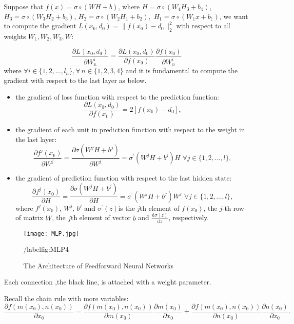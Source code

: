 \documentclass[titlestyle=hang,11pt]{elegantbook}
\begin{document}
Suppose that $f(x)={\sigma}\circ(WH + b)$, where $H=\sigma\circ(W_4H_3 + b_4)$, $H_3=\sigma\circ(W_3H_2 + b_3)$, $H_2=\sigma\circ(W_2H_1 + b_2), $ $H_1=\sigma\circ(W_1x + b_1)$,
we want to compute the gradient $L(x_0,d_0)=\|f(x_0)-d_0\|^{2}_2$ with respect to all weights $W_1,W_2,W_3,W$:

$$\frac{\partial L(x_0,d_0)}{\partial W_n^i}=\frac{\partial L(x_0,d_0)}{\partial f(x_0)}\frac{\partial f(x_0)}{\partial W_n^i}$$
 where $\forall i\in\{1,2,\dots,l_n\}, \forall\,n\in\{1,2,3,4\}$
and it is fundamental to compute the gradient with respect to the last layer as below.
\begin{itemize}
	\item the gradient of loss function with respect to the prediction function:
		$$\frac{\partial L(x_0,d_0)}{\partial f(x_0)}=2[f(x_0)-d_0],$$

	\item the gradient of each unit in prediction function with respect to the weight in the last layer:
		$$
		\frac{\partial f^{j}(x_0)}{\partial W^j}=
		\frac{\partial \sigma(W^jH+b^j)}{\partial W^j}=
		{\sigma}^{\prime}(W^jH+b^j) H \,\,\forall j\in\{1,2,\dots,l\},
		$$

	\item the gradient of prediction function with respect to the last hidden state:
		$$
		\frac{\partial f^{j}(x_0)}{\partial H}  =
		\frac{\partial \sigma(W^jH+b^j)}{\partial H}  =
		{\sigma}^{\prime}(W^jH+b^j) W^j \,\,\forall j\in\{1,2,\dots,l\},
		$$
where $f^{j}(x_0)$, $W^{j}$, $b^j$ and $\sigma^{\prime}(z)$is the $j$th element of $f(x_0)$, 
the $j$-th row of matrix $W$, the $j$th element of vector $b$ and $\frac{\mathrm{d}\sigma(z)}{\mathrm{d} z}$, respectively.
\end{itemize}


\begin{figure}[!htbp]
\centering
\texttt{[image: MLP.jpg]}
\caption{The Architecture of Feedforward Neural Networks}/label{fig:MLP4}
\end{figure}

\begin{note}
  Each connection ,the black line, is attached with a weight parameter.
\end{note}

Recall the chain rule with more variables:
$$\frac{\partial f(m(x_0),n(x_0))}{\partial x_0}
	=  \frac{\partial f(m(x_0),n(x_0))}{\partial m(x_0)}\frac{\partial m(x_0)}{\partial x_0} + 
	  \frac{\partial f(m(x_0),n(x_0))}{\partial n(x_0)}\frac{\partial n(x_0)}{\partial x_0}.$$
\end{document}
